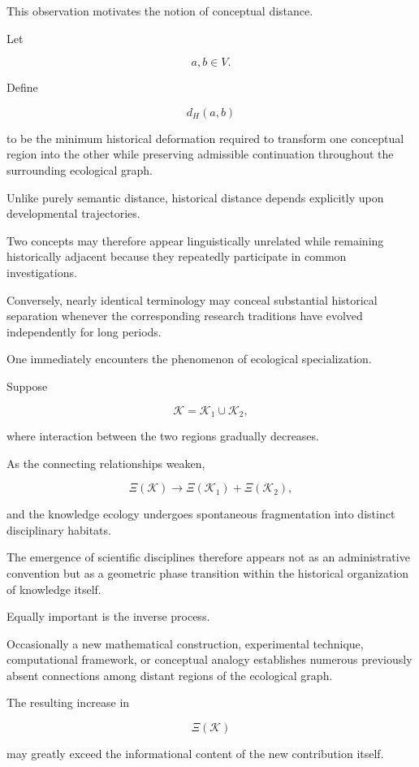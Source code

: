 \documentclass[12pt,oneside]{article}
\theoremstyle{remark}
\begin{document}
This observation motivates the notion of conceptual distance.

Let

\[
a,b
\in
V.
\]

Define

\[
d_H(a,b)
\]

to be the minimum historical deformation required to transform one conceptual
region into the other while preserving admissible continuation throughout the
surrounding ecological graph.

Unlike purely semantic distance, historical distance depends explicitly upon
developmental trajectories.

Two concepts may therefore appear linguistically unrelated while remaining
historically adjacent because they repeatedly participate in common
investigations.

Conversely, nearly identical terminology may conceal substantial historical
separation whenever the corresponding research traditions have evolved
independently for long periods.

One immediately encounters the phenomenon of ecological specialization.

Suppose

\[
\mathcal K
=
\mathcal K_1
\cup
\mathcal K_2,
\]

where interaction between the two regions gradually decreases.

As the connecting relationships weaken,

\[
\Xi(\mathcal K)
\rightarrow
\Xi(\mathcal K_1)
+
\Xi(\mathcal K_2),
\]

and the knowledge ecology undergoes spontaneous fragmentation into distinct
disciplinary habitats.

The emergence of scientific disciplines therefore appears not as an
administrative convention but as a geometric phase transition within the
historical organization of knowledge itself.

Equally important is the inverse process.

Occasionally a new mathematical construction, experimental technique,
computational framework, or conceptual analogy establishes numerous previously
absent connections among distant regions of the ecological graph.

The resulting increase in

\[
\Xi(\mathcal K)
\]

may greatly exceed the informational content of the new contribution itself.
\end{document}
